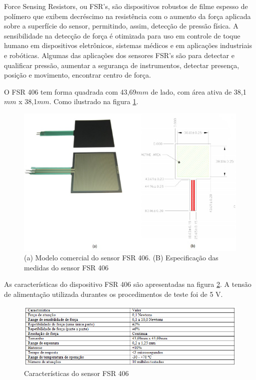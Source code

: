 Force Sensing Resistors, ou FSR’s, são dispositivos robustos de filme espesso de polímero que exibem decréscimo na resistência com o aumento da força aplicada sobre a superfície do sensor, permitindo, assim, detecção de pressão física. A sensibilidade na detecção de força é otimizada para uso em controle de toque humano em dispositivos eletrônicos, sistemas médicos e em aplicações industriais e robóticas. Algumas das aplicações dos sensores FSR’s são para detectar e qualificar pressão, aumentar a segurança de instrumentos, detectar presença, posição e movimento, encontrar centro de força.

O FSR 406 tem forma quadrada com 43,69$mm$ de lado, com área ativa de 38,1$mm$ x 38,1$mm$. Como ilustrado na figura \ref{sensor2}.

\begin{figure}[htb]
		\centering
			\includegraphics[scale=1.0]{figuras/sensor2.png}
		\caption{(a) Modelo comercial do sensor FSR 406. (B) Especificação das medidas do sensor FSR 406 \cite{sensor2}}
		\label{sensor2}
\end{figure}

As características do dispositivo FSR 406 são apresentadas na figura \ref{caractsensor2}. A tensão de alimentação utilizada durantes os procedimentos de teste foi de 5 V.

\begin{figure}[htb]
		\centering
			\includegraphics[scale=0.9]{figuras/caractsensor2.png}
		\caption{Características do sensor FSR 406 \cite{sensor2}}
		\label{caractsensor2}
\end{figure}

